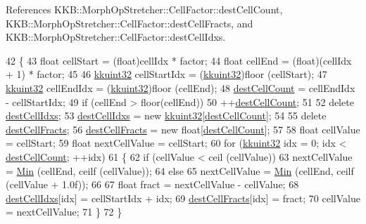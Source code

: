 References K\+K\+B\+::\+Morph\+Op\+Stretcher\+::\+Cell\+Factor\+::dest\+Cell\+Count, K\+K\+B\+::\+Morph\+Op\+Stretcher\+::\+Cell\+Factor\+::dest\+Cell\+Fracts, and K\+K\+B\+::\+Morph\+Op\+Stretcher\+::\+Cell\+Factor\+::dest\+Cell\+Idxs.


\begin{DoxyCode}
42   \{
43     \textcolor{keywordtype}{float}  cellStart = (float)cellIdx * factor;
44     \textcolor{keywordtype}{float}  cellEnd   = (float)(cellIdx + 1) * factor;
45 
46     \hyperlink{namespace_k_k_b_af8d832f05c54994a1cce25bd5743e19a}{kkuint32} cellStartIdx = (\hyperlink{namespace_k_k_b_af8d832f05c54994a1cce25bd5743e19a}{kkuint32})floor (cellStart);
47     \hyperlink{namespace_k_k_b_af8d832f05c54994a1cce25bd5743e19a}{kkuint32} cellEndIdx   = (\hyperlink{namespace_k_k_b_af8d832f05c54994a1cce25bd5743e19a}{kkuint32})floor (cellEnd);
48     \hyperlink{class_morph_op_stretcher_1_1_cell_factor_a4ea39788e14a1b8d0ea4bf0634991f81}{destCellCount} = cellEndIdx - cellStartIdx;
49     \textcolor{keywordflow}{if}  (cellEnd > floor(cellEnd))
50       ++\hyperlink{class_morph_op_stretcher_1_1_cell_factor_a4ea39788e14a1b8d0ea4bf0634991f81}{destCellCount};
51     
52     \textcolor{keyword}{delete}  \hyperlink{class_morph_op_stretcher_1_1_cell_factor_ad98db8b4eb2b3513ad0a592250bacc06}{destCellIdxs};
53     \hyperlink{class_morph_op_stretcher_1_1_cell_factor_ad98db8b4eb2b3513ad0a592250bacc06}{destCellIdxs} = \textcolor{keyword}{new} \hyperlink{namespace_k_k_b_af8d832f05c54994a1cce25bd5743e19a}{kkuint32}[\hyperlink{class_morph_op_stretcher_1_1_cell_factor_a4ea39788e14a1b8d0ea4bf0634991f81}{destCellCount}];
54 
55     \textcolor{keyword}{delete}  \hyperlink{class_morph_op_stretcher_1_1_cell_factor_aaa0ecc31b4ade20727b2a6fa61bf938c}{destCellFracts};
56     \hyperlink{class_morph_op_stretcher_1_1_cell_factor_aaa0ecc31b4ade20727b2a6fa61bf938c}{destCellFracts} = \textcolor{keyword}{new} \textcolor{keywordtype}{float}[\hyperlink{class_morph_op_stretcher_1_1_cell_factor_a4ea39788e14a1b8d0ea4bf0634991f81}{destCellCount}];
57 
58     \textcolor{keywordtype}{float} cellValue     = cellStart;
59     \textcolor{keywordtype}{float} nextCellValue = cellStart;
60     \textcolor{keywordflow}{for}  (\hyperlink{namespace_k_k_b_af8d832f05c54994a1cce25bd5743e19a}{kkuint32}  idx = 0;  idx < \hyperlink{class_morph_op_stretcher_1_1_cell_factor_a4ea39788e14a1b8d0ea4bf0634991f81}{destCellCount};  ++idx)
61     \{
62       \textcolor{keywordflow}{if}  (cellValue < ceil (cellValue))
63         nextCellValue = \hyperlink{_raster_8cpp_a6261a282d8ed27242c636ad5fb658585}{Min} (cellEnd, ceilf (cellValue));
64       \textcolor{keywordflow}{else}
65         nextCellValue = \hyperlink{_raster_8cpp_a6261a282d8ed27242c636ad5fb658585}{Min} (cellEnd, ceilf (cellValue + 1.0f));
66 
67       \textcolor{keywordtype}{float}  fract = nextCellValue - cellValue;
68       \hyperlink{class_morph_op_stretcher_1_1_cell_factor_ad98db8b4eb2b3513ad0a592250bacc06}{destCellIdxs}[idx]   = cellStartIdx + idx;
69       \hyperlink{class_morph_op_stretcher_1_1_cell_factor_aaa0ecc31b4ade20727b2a6fa61bf938c}{destCellFracts}[idx] = fract;
70       cellValue = nextCellValue;
71     \}
72   \}
\end{DoxyCode}


